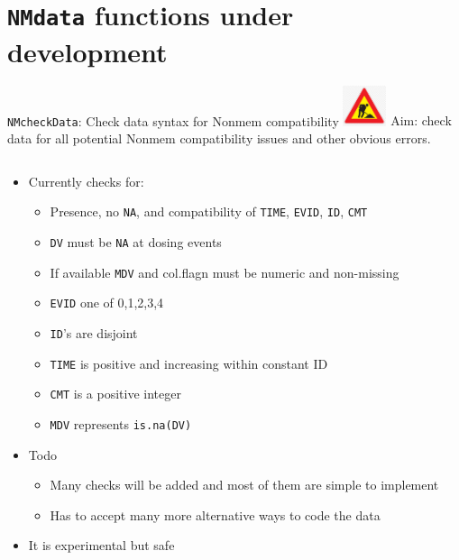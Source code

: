 \documentclass[
  8pt,
  ignorenonframetext,
  aspectratio=169]{beamer}
\providecommand{\tightlist}{%
  \setlength{\itemsep}{0pt}\setlength{\parskip}{0pt}}
\begin{document}
\hypertarget{nmdata-functions-under-development}{%
\section{\texorpdfstring{\texttt{NMdata} functions under
development}{NMdata functions under development}}\label{nmdata-functions-under-development}}

\begin{frame}[fragile]{\texttt{NMcheckData}: Check data syntax for
Nonmem compatibility
\includegraphics[width=0.5in]{figures/worksign.png}}
\protect\hypertarget{nmcheckdata-check-data-syntax-for-nonmem-compatibility}{}
Aim: check data for all potential Nonmem compatibility issues and other
obvious errors.

\begin{columns}[T]
\begin{column}{0.48\textwidth}
\begin{itemize}
\tightlist
\item
  Currently checks for:

  \begin{itemize}
  \tightlist
  \item
    Presence, no \texttt{NA}, and compatibility of \texttt{TIME},
    \texttt{EVID}, \texttt{ID}, \texttt{CMT}
  \item
    \texttt{DV} must be \texttt{NA} at dosing events
  \item
    If available \texttt{MDV} and col.flagn must be numeric and
    non-missing
  \item
    \texttt{EVID} one of 0,1,2,3,4
  \item
    \texttt{ID}'s are disjoint
  \item
    \texttt{TIME} is positive and increasing within constant ID
  \item
    \texttt{CMT} is a positive integer
  \item
    \texttt{MDV} represents \texttt{is.na(DV)}
  \end{itemize}
\item
  Todo

  \begin{itemize}
  \tightlist
  \item
    Many checks will be added and most of them are simple to implement
  \item
    Has to accept many more alternative ways to code the data
  \end{itemize}
\item
  It is experimental but safe


\end{itemize}
\end{column}
\end{columns}
\end{frame}
\end{document}

